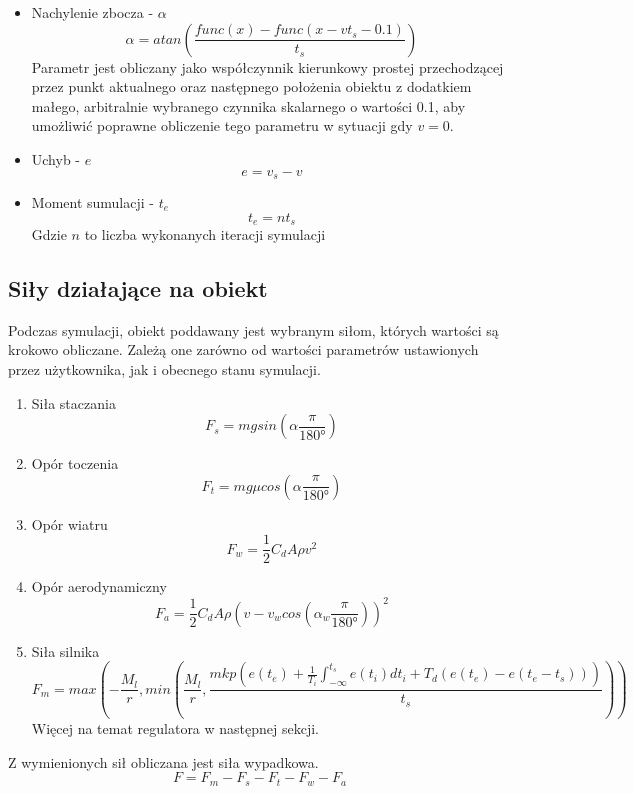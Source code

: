 \documentclass[12pt,a4paper]{article}
\begin{document}
	\begin{itemize}
		\item Nachylenie zbocza - $\alpha$ \\
		\[
		\alpha = atan \left( \frac{func(x) - func(x - vt_s - 0.1)}{t_s} \right)
		\]
		Parametr jest obliczany jako współczynnik kierunkowy prostej przechodzącej przez punkt aktualnego oraz następnego położenia obiektu z dodatkiem małego, arbitralnie wybranego czynnika skalarnego o wartości 0.1, aby umożliwić poprawne obliczenie tego parametru w sytuacji gdy $v = 0$.
		\item Uchyb - $e$
		\[
			e = v_s - v
		\]
		\item Moment sumulacji - $t_e$
		\[
			t_e = n t_s
		\]
		Gdzie $n$ to liczba wykonanych iteracji symulacji
	\end{itemize}
	
	\subsection{Siły działające na obiekt}
	Podczas symulacji, obiekt poddawany jest wybranym siłom, których wartości są krokowo obliczane. Zależą one zarówno od wartości parametrów ustawionych przez użytkownika, jak i obecnego stanu symulacji.
	\begin{enumerate}
		\item Siła staczania
		\[
			F_s = mgsin\left(\alpha\frac{\pi}{180°}\right)
		\]
		\item Opór toczenia
		\[
			F_t = mg\mu cos\left(\alpha\frac{\pi}{180°}\right)
		\]
		\item Opór wiatru
		\[
			F_w = \frac{1}{2} C_d A \rho v^2
		\]
		\item Opór aerodynamiczny
		\[
			F_a = \frac{1}{2} C_d A \rho (v - v_wcos(\alpha_w\frac{\pi}{180°}))^2
		\]
		\item Siła silnika
		\[
			F_m = max\left(-\frac{M_l}{r} ,min\left(\frac{M_l}{r}, \frac{mkp\left(e(t_e) + \frac{1}{T_i}\int_{-\infty}^{t_s}e(t_i)dt_i + T_d(e(t_e) - e(t_e - t_s))\right)}{t_s}\right)\right)
		\]
		Więcej na temat regulatora w następnej sekcji.
	\end{enumerate}
	Z wymienionych sił obliczana jest siła wypadkowa.
	\[
		F = F_m - F_s - F_t - F_w - F_a
	\]
	
\end{document}
